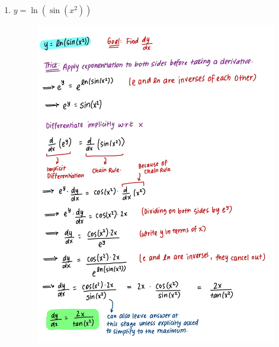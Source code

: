\documentclass{article}
\begin{document}
\begin{enumerate}
\begin{figure}[H]
    \end{figure}
    \newpage
    \item $y = \ln(\sin(x^2))$
    \begin{figure}[H]
        \centering
        \includegraphics[width=0.9\linewidth]{Q1.4.jpg}
        \label{fig:Q1.4}
    \end{figure}

\end{enumerate}
\end{document}
